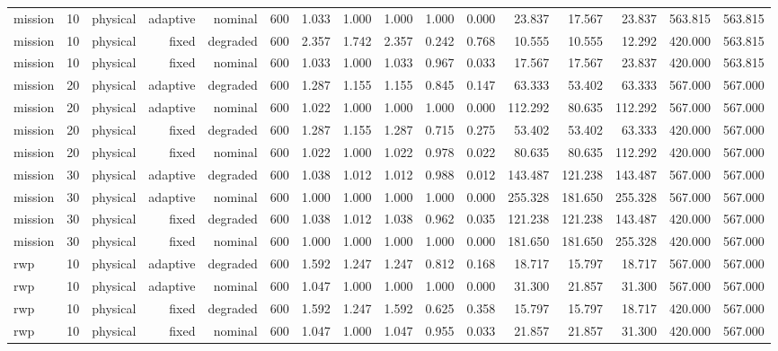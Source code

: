 \begin{tabular}{lrrrrrrrrrrrrrrr}
mission & 10 & physical & adaptive & nominal & 600 & 1.033 & 1.000 & 1.000 & 1.000 & 0.000 & 23.837 & 17.567 & 23.837 & 563.815 & 563.815 \\
mission & 10 & physical & fixed & degraded & 600 & 2.357 & 1.742 & 2.357 & 0.242 & 0.768 & 10.555 & 10.555 & 12.292 & 420.000 & 563.815 \\
mission & 10 & physical & fixed & nominal & 600 & 1.033 & 1.000 & 1.033 & 0.967 & 0.033 & 17.567 & 17.567 & 23.837 & 420.000 & 563.815 \\
mission & 20 & physical & adaptive & degraded & 600 & 1.287 & 1.155 & 1.155 & 0.845 & 0.147 & 63.333 & 53.402 & 63.333 & 567.000 & 567.000 \\
mission & 20 & physical & adaptive & nominal & 600 & 1.022 & 1.000 & 1.000 & 1.000 & 0.000 & 112.292 & 80.635 & 112.292 & 567.000 & 567.000 \\
mission & 20 & physical & fixed & degraded & 600 & 1.287 & 1.155 & 1.287 & 0.715 & 0.275 & 53.402 & 53.402 & 63.333 & 420.000 & 567.000 \\
mission & 20 & physical & fixed & nominal & 600 & 1.022 & 1.000 & 1.022 & 0.978 & 0.022 & 80.635 & 80.635 & 112.292 & 420.000 & 567.000 \\
mission & 30 & physical & adaptive & degraded & 600 & 1.038 & 1.012 & 1.012 & 0.988 & 0.012 & 143.487 & 121.238 & 143.487 & 567.000 & 567.000 \\
mission & 30 & physical & adaptive & nominal & 600 & 1.000 & 1.000 & 1.000 & 1.000 & 0.000 & 255.328 & 181.650 & 255.328 & 567.000 & 567.000 \\
mission & 30 & physical & fixed & degraded & 600 & 1.038 & 1.012 & 1.038 & 0.962 & 0.035 & 121.238 & 121.238 & 143.487 & 420.000 & 567.000 \\
mission & 30 & physical & fixed & nominal & 600 & 1.000 & 1.000 & 1.000 & 1.000 & 0.000 & 181.650 & 181.650 & 255.328 & 420.000 & 567.000 \\
rwp & 10 & physical & adaptive & degraded & 600 & 1.592 & 1.247 & 1.247 & 0.812 & 0.168 & 18.717 & 15.797 & 18.717 & 567.000 & 567.000 \\
rwp & 10 & physical & adaptive & nominal & 600 & 1.047 & 1.000 & 1.000 & 1.000 & 0.000 & 31.300 & 21.857 & 31.300 & 567.000 & 567.000 \\
rwp & 10 & physical & fixed & degraded & 600 & 1.592 & 1.247 & 1.592 & 0.625 & 0.358 & 15.797 & 15.797 & 18.717 & 420.000 & 567.000 \\
rwp & 10 & physical & fixed & nominal & 600 & 1.047 & 1.000 & 1.047 & 0.955 & 0.033 & 21.857 & 21.857 & 31.300 & 420.000 & 567.000 \\

\end{tabular}
